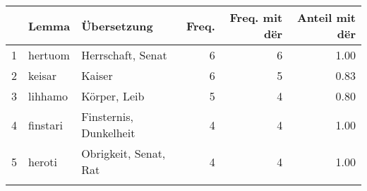 \begin{tabular}{rllrrr}
  \lsptoprule
 & Lemma & Übersetzung & Freq. & Freq. mit dër & Anteil mit dër \\ 
  \midrule
1 & hertuom & Herrschaft, Senat &   6 &   6 & 1.00 \\ 
  2 & keisar & Kaiser &   6 &   5 & 0.83 \\ 
  3 & lihhamo & Körper, Leib &   5 &   4 & 0.80 \\ 
  4 & finstari & Finsternis, Dunkelheit &   4 &   4 & 1.00 \\ 
  5 & heroti & Obrigkeit, Senat, Rat &   4 &   4 & 1.00 \\ 
   \lspbottomrule
\end{tabular}
